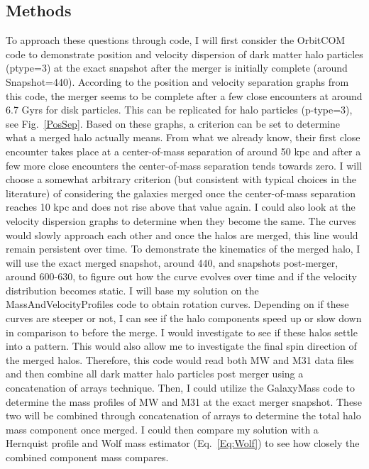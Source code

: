 \documentclass[linenumbers,trackchanges]{aastex7}
\begin{document}
\subsection{Methods}
To approach these questions through code, I will first consider the OrbitCOM code to demonstrate position and velocity dispersion of dark matter halo particles (ptype=3) at the exact snapshot after the merger is initially complete (around Snapshot=440). According to the position and velocity separation graphs from this code, the merger seems to be complete after a few close encounters at around 6.7 Gyrs for disk particles. This can be replicated for halo particles (p-type=3), see Fig.~\ref{PosSep}. Based on these graphs, a criterion can be set to determine what a merged halo actually means. From what we already know, their first close encounter takes place at a center-of-mass separation of around 50 kpc and after a few more close encounters the center-of-mass separation tends towards zero. I will choose a somewhat arbitrary criterion (but consistent with typical choices in the literature) of considering the galaxies merged once the center-of-mass separation reaches 10 kpc and does not rise above that value again. I could also look at the velocity dispersion graphs to determine when they become the same. The curves would slowly approach each other and once the halos are merged, this line would remain persistent over time. To demonstrate the kinematics of the merged halo, I will use the exact merged snapshot, around 440, and snapshots post-merger, around 600-630, to figure out how the curve evolves over time and if the velocity distribution becomes static. I will base my solution on the MassAndVelocityProfiles code to obtain rotation curves. Depending on if these curves are steeper or not, I can see if the halo components speed up or slow down in comparison to before the merge. I would investigate to see if these halos settle into a pattern. This would also allow me to investigate the final spin direction of the merged halos. Therefore, this code would read both MW and M31 data files and then combine all dark matter halo particles post merger using a concatenation of arrays technique. Then, I could utilize the GalaxyMass code to determine the mass profiles of MW and M31 at the exact merger snapshot. These two will be combined through concatenation of arrays to determine the total halo mass component once merged. I could then compare my solution with a Hernquist profile and Wolf mass estimator (Eq.~\ref{Eq:Wolf}) to see how closely the combined component mass compares.
\end{document}
